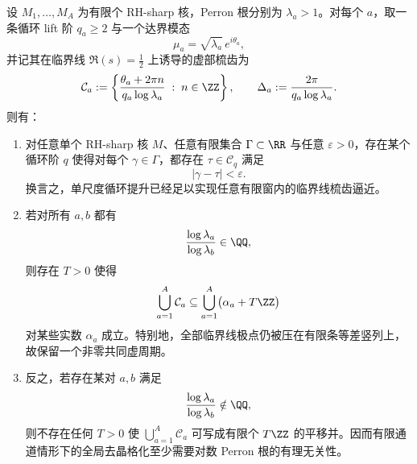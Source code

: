 \begin{theorem}[有限窗梳齿拟合与全局去晶格化的有理无关障碍]\label{thm:conclusion-cyclic-lift-finitewindow-delattice-obstruction}
设 \(M_1,\dots,M_A\) 为有限个 RH-sharp 核，Perron 根分别为 \(\lambda_a>1\)。对每个 \(a\)，取一条循环 lift 阶 \(q_a\ge 2\) 与一个达界模态
\[
\mu_a=\sqrt{\lambda_a}\,e^{i\theta_a},
\]
并记其在临界线 \(\Re(s)=\frac12\) 上诱导的虚部梳齿为
\[
\mathcal C_a:=
\left\{
\frac{\theta_a+2\pi n}{q_a\log\lambda_a}
\;:\;
n\in\ZZ
\right\},
\qquad
\Delta_a:=\frac{2\pi}{q_a\log\lambda_a}.
\]
则有：
\begin{enumerate}
  \item 对任意单个 RH-sharp 核 \(M\)、任意有限集合 \(\Gamma\subset\RR\) 与任意 \(\varepsilon>0\)，存在某个循环阶 \(q\) 使得对每个 \(\gamma\in\Gamma\)，都存在 \(\tau\in\mathcal C_q\) 满足
  \[
  |\gamma-\tau|<\varepsilon.
  \]
  换言之，单尺度循环提升已经足以实现任意有限窗内的临界线梳齿逼近。
  \item 若对所有 \(a,b\) 都有
  \[
  \frac{\log\lambda_a}{\log\lambda_b}\in\QQ,
  \]
  则存在 \(T>0\) 使得
  \[
  \bigcup_{a=1}^{A}\mathcal C_a
  \subseteq
  \bigcup_{a=1}^{A}\bigl(\alpha_a+T\ZZ\bigr)
  \]
  对某些实数 \(\alpha_a\) 成立。特别地，全部临界线极点仍被压在有限条等差竖列上，故保留一个非零共同虚周期。
  \item 反之，若存在某对 \(a,b\) 满足
  \[
  \frac{\log\lambda_a}{\log\lambda_b}\notin\QQ,
  \]
  则不存在任何 \(T>0\) 使 \(\bigcup_{a=1}^{A}\mathcal C_a\) 可写成有限个 \(T\ZZ\) 的平移并。因而有限通道情形下的全局去晶格化至少需要对数 Perron 根的有理无关性。
\end{enumerate}
\end{theorem}
